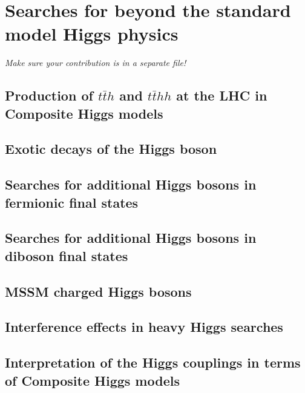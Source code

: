 \documentclass[../report.tex]{subfiles}
\providecommand{\main}{..}
\begin{document}
\section{Searches for beyond the standard model Higgs physics}

\emph{Make sure your contribution is in a separate file!}

%

\subsection{Production of $t\bar{t}h$ and $t\bar{t}h h$ at the LHC in Composite Higgs models}


\subsection{Exotic decays of the Higgs boson}





\subsection{Searches for additional Higgs bosons in fermionic final states}




\subsection{Searches for additional Higgs bosons in diboson final states}

\subsection{MSSM charged Higgs bosons}


\subsection{Interference effects in heavy Higgs searches}


\subsection{Interpretation of the Higgs couplings in terms of Composite Higgs models}

\end{document}
